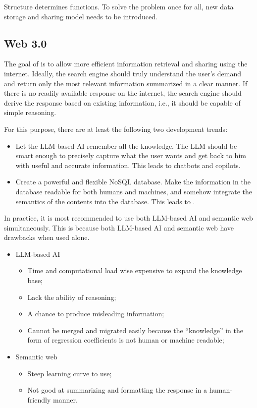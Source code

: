 Structure determines functions. To solve the problem once for all, new data storage and sharing model needs to be introduced.

\subsection{Web 3.0}

The goal of  is to allow more efficient information retrieval and sharing using the internet. Ideally, the search engine should truly understand the user's demand and return only the most relevant information summarized in a clear manner. If there is no readily available response on the internet, the search engine should derive the response based on existing information, i.e., it should be capable of simple reasoning. 

For this purpose, there are at least the following two development trends:
\begin{itemize}
  \item Let the LLM-based AI remember all the knowledge. The LLM should be smart enough to precisely capture what the user wants and get back to him with useful and accurate information. This leads to chatbots and copilots.
  \item Create a powerful and flexible NoSQL database. Make the information in the database readable for both humans and machines, and somehow integrate the semantics of the contents into the database. This leads to .
\end{itemize}

In practice, it is most recommended to use both LLM-based AI and semantic web simultaneously. This is because both LLM-based AI and semantic web have drawbacks when used alone.
\begin{itemize}
	\item LLM-based AI
	\begin{itemize}
		\item Time and computational load wise expensive to expand the knowledge base;
		\item Lack the ability of reasoning;
		\item A chance to produce misleading information;
		\item Cannot be merged and migrated easily because the ``knowledge'' in the form of regression coefficients is not human or machine readable;
	\end{itemize}
	\item Semantic web
	\begin{itemize}
		\item Steep learning curve to use;
		\item Not good at summarizing and formatting the response in a human-friendly manner.
	\end{itemize}
\end{itemize}

